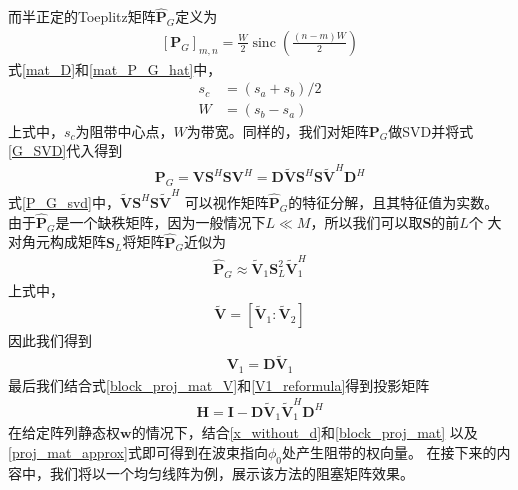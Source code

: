 \documentclass[master]{thesis-uestc}
\begin{document}
而半正定的Toeplitz矩阵$\hat{\bm{P}}_G$定义为
\begin{equation}\label{mat_P_G_hat}
    \begin{aligned}
         \left[\bm{P}_G\right]_{m,n}=\frac{W}{2} \operatorname{sinc}\left(\frac{(n-m) W}{2}\right)
    \end{aligned}
\end{equation}
式\eqref{mat_D}和\eqref{mat_P_G_hat}中，
\begin{subequations}
    \begin{align}
        s_c &= (s_a + s_b)/2
        \\
        W &= (s_b - s_a)
    \end{align}
\end{subequations}
上式中，$s_c$为阻带中心点，$W$为带宽。同样的，我们对矩阵$\bm{P}_G$做SVD并将式\eqref{G_SVD}代入得到
\begin{equation}\label{P_G_svd}
    \begin{aligned}
        \bm{P}_G = \bm{V}\bm{S}^H\bm{S}\bm{V}^H 
                 = \bm{D}\tilde{\bm{V}}\bm{S}^H\bm{S}\tilde{\bm{V}}^H\bm{D}^H
    \end{aligned}
\end{equation}
式\eqref{P_G_svd}中，$\tilde{\bm{V}}\bm{S}^H\bm{S}\tilde{\bm{V}}^H$
可以视作矩阵$\hat{\bm{P}}_G$的特征分解，且其特征值为实数。
由于$\hat{\bm{P}}_G$是一个缺秩矩阵，因为一般情况下$L \ll M$，所以我们可以取$\bm{S}$的前$L$个
大对角元构成矩阵$\bm{S}_L$将矩阵$\hat{\bm{P}}_G$近似为
\begin{equation}\label{P_G_hat_approx}
    \begin{aligned}
        \hat{\bm{P}}_G \approx \tilde{\bm{V}}_1\bm{S}_L^2\tilde{\bm{V}}_1^H
    \end{aligned}
\end{equation}
上式中，
\begin{equation}
    \begin{aligned}
        \tilde{\bm{V}} = \left[\tilde{\bm{V}}_1:\tilde{\bm{V}}_2\right]
    \end{aligned}
\end{equation}
因此我们得到
\begin{equation}\label{V1_reformula}
    \begin{aligned}
        \bm{V}_1 = \bm{D}\tilde{\bm{V}}_1
    \end{aligned}
\end{equation}
最后我们结合式\eqref{block_proj_mat_V}和\eqref{V1_reformula}得到投影矩阵
\begin{equation}\label{proj_mat_approx}
    \begin{aligned}
        \bm{H} = \bm{I} - \bm{D}\tilde{\bm{V}}_1\tilde{\bm{V}}_1^H\bm{D}^H
    \end{aligned}
\end{equation}
在给定阵列静态权$\bm{w}$的情况下，结合\eqref{x_without_d}和\eqref{block_proj_mat}
以及\eqref{proj_mat_approx}式即可得到在波束指向$\phi_0$处产生阻带的权向量。
在接下来的内容中，我们将以一个均匀线阵为例，展示该方法的阻塞矩阵效果。
\end{document}
